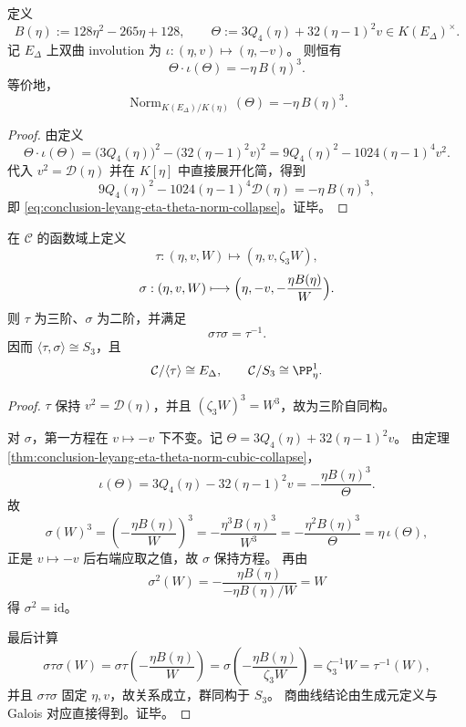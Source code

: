\begin{theorem}[二次共轭范数的立方坍缩恒等式]\label{thm:conclusion-leyang-eta-theta-norm-cubic-collapse}
定义
\[
B(\eta):=128\eta^2-265\eta+128,\qquad
\Theta:=3Q_4(\eta)+32(\eta-1)^2v\in K(E_\Delta)^\times.
\]
记 \(E_\Delta\) 上双曲 involution 为
\(
\iota:(\eta,v)\mapsto(\eta,-v)
\)。
则恒有
\begin{equation}\label{eq:conclusion-leyang-eta-theta-norm-collapse}
\Theta\cdot\iota(\Theta)=-\eta\,B(\eta)^3.
\end{equation}
等价地，
\[
\operatorname{Norm}_{K(E_\Delta)/K(\eta)}(\Theta)
=-\eta\,B(\eta)^3.
\]
\end{theorem}
\begin{proof}
由定义
\[
\Theta\cdot\iota(\Theta)
=\bigl(3Q_4(\eta)\bigr)^2-\bigl(32(\eta-1)^2v\bigr)^2
=9Q_4(\eta)^2-1024(\eta-1)^4v^2.
\]
代入 \(v^2=\mathscr D(\eta)\) 并在 \(K[\eta]\) 中直接展开化简，得到
\[
9Q_4(\eta)^2-1024(\eta-1)^4\mathscr D(\eta)
=-\eta\,B(\eta)^3,
\]
即 \eqref{eq:conclusion-leyang-eta-theta-norm-collapse}。证毕。
\end{proof}

\begin{theorem}\label{thm:conclusion-leyang-eta-explicit-s3-action-on-cardano-model}
在 \(\mathcal C\) 的函数域上定义
\[
\tau:(\eta,v,W)\longmapsto(\eta,v,\zeta_3W),
\]
\[
\sigma:(\eta,v,W)\longmapsto
\Bigl(\eta,-v,-\frac{\eta B(\eta)}{W}\Bigr).
\]
则 \(\tau\) 为三阶、\(\sigma\) 为二阶，并满足
\[
\sigma\tau\sigma=\tau^{-1}.
\]
因而 \(\langle\tau,\sigma\rangle\cong S_3\)，且
\[
\mathcal C/\langle\tau\rangle\cong E_\Delta,\qquad
\mathcal C/S_3\cong\PP^1_\eta.
\]
\end{theorem}
\begin{proof}
\(\tau\) 保持 \(v^2=\mathscr D(\eta)\)，并且
\((\zeta_3W)^3=W^3\)，故为三阶自同构。

对 \(\sigma\)，第一方程在 \(v\mapsto -v\) 下不变。记
\(
\Theta=3Q_4(\eta)+32(\eta-1)^2v
\)。
由定理 \ref{thm:conclusion-leyang-eta-theta-norm-cubic-collapse}，
\[
\iota(\Theta)=3Q_4(\eta)-32(\eta-1)^2v
=-\frac{\eta B(\eta)^3}{\Theta}.
\]
故
\[
\sigma(W)^3
=\left(-\frac{\eta B(\eta)}{W}\right)^3
=-\frac{\eta^3B(\eta)^3}{W^3}
=-\frac{\eta^2B(\eta)^3}{\Theta}
=\eta\,\iota(\Theta),
\]
正是 \(v\mapsto -v\) 后右端应取之值，故 \(\sigma\) 保持方程。
再由
\[
\sigma^2(W)
=-\frac{\eta B(\eta)}{-\eta B(\eta)/W}
=W
\]
得 \(\sigma^2=\mathrm{id}\)。

最后计算
\[
\sigma\tau\sigma(W)
=\sigma\tau\!\left(-\frac{\eta B(\eta)}{W}\right)
=\sigma\!\left(-\frac{\eta B(\eta)}{\zeta_3W}\right)
=\zeta_3^{-1}W
=\tau^{-1}(W),
\]
并且 \(\sigma\tau\sigma\) 固定 \(\eta,v\)，故关系成立，群同构于 \(S_3\)。
商曲线结论由生成元定义与 Galois 对应直接得到。证毕。
\end{proof}

